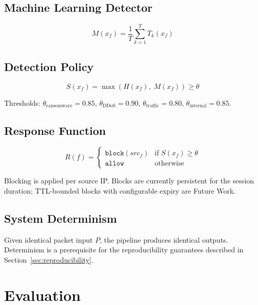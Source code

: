 \documentclass[11pt,a4paper]{article}
\begin{document}
    \subsection{Machine Learning Detector}

    \begin{equation}
        M(x_f) = \frac{1}{T} \sum_{k=1}^{T} T_k(x_f)
    \end{equation}

    \subsection{Detection Policy}

    \begin{equation}
        S(x_f) = \max\!\left(H(x_f),\; M(x_f)\right) \geq \theta
    \end{equation}

    Thresholds: $\theta_{\text{ransomware}} = 0.85$, $\theta_{\text{DDoS}} = 0.90$,
    $\theta_{\text{traffic}} = 0.80$, $\theta_{\text{internal}} = 0.85$.

    \subsection{Response Function}

    \begin{equation}
        R(f) = \begin{cases}
                   \texttt{block}(src_f) & \text{if } S(x_f) \geq \theta \\
                   \texttt{allow}        & \text{otherwise}
        \end{cases}
    \end{equation}

    Blocking is applied per source IP. Blocks are currently persistent for the session duration;
    TTL-bounded blocks with configurable expiry are Future Work.

    \subsection{System Determinism}

    Given identical packet input $P$, the pipeline produces identical outputs. Determinism is a
    prerequisite for the reproducibility guarantees described in Section~\ref{sec:reproducibility}.

    \section{Evaluation}
    \label{sec:eval}
\end{document}
